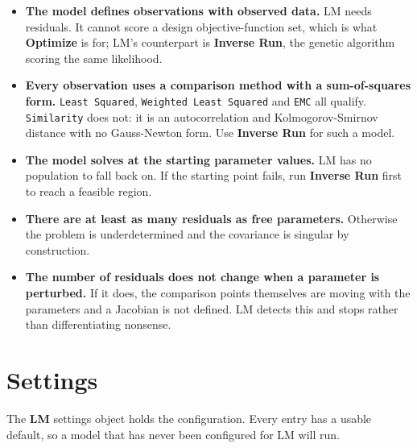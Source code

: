 \documentclass[11pt,a4paper]{article}
\newcommand{\code}[1]{\texttt{\small #1}}
\begin{document}
\begin{itemize}[leftmargin=1.4em]
  \item \textbf{The model defines observations with observed data.} LM needs
        residuals. It cannot score a design objective-function set, which is
        what \textbf{Optimize} is for; LM's counterpart is \textbf{Inverse
        Run}, the genetic algorithm scoring the same likelihood.
  \item \textbf{Every observation uses a comparison method with a
        sum-of-squares form.} \code{Least Squared}, \code{Weighted Least
        Squared} and \code{EMC} all qualify. \code{Similarity} does not: it is
        an autocorrelation and Kolmogorov-Smirnov distance with no
        Gauss-Newton form. Use \textbf{Inverse Run} for such a model.
  \item \textbf{The model solves at the starting parameter values.} LM has no
        population to fall back on. If the starting point fails, run
        \textbf{Inverse Run} first to reach a feasible region.
  \item \textbf{There are at least as many residuals as free parameters.}
        Otherwise the problem is underdetermined and the covariance is
        singular by construction.
  \item \textbf{The number of residuals does not change when a parameter is
        perturbed.} If it does, the comparison points themselves are moving
        with the parameters and a Jacobian is not defined. LM detects this and
        stops rather than differentiating nonsense.
\end{itemize}

\section{Settings}

The \textbf{LM} settings object holds the configuration. Every entry has a
usable default, so a model that has never been configured for LM will run.
\end{document}
